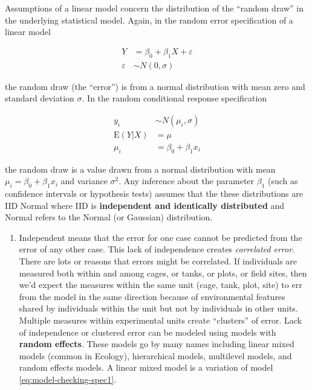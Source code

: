 \documentclass[]{book}
\providecommand{\tightlist}{%
  \setlength{\itemsep}{0pt}\setlength{\parskip}{0pt}}
\begin{document}
Assumptions of a linear model concern the distribution of the ``random draw'' in the underlying statistical model. Again, in the random error specification of a linear model

\begin{align}
Y &= \beta_0 + \beta_1 X + \varepsilon\\
\varepsilon &\sim N(0, \sigma)
\label{eq:model-checking-spec1}
\end{align}

the random draw (the ``error'') is from a normal distribution with mean zero and standard deviation \(\sigma\). In the random conditional response specification

\begin{align}
y_i &\sim N(\mu_i, \sigma)\\
\mathrm{E}(Y|X) &= \mu\\
\mu_i &= \beta_0 + \beta_1 x_i
\label{eq:model-checking-spec2}
\end{align}

the random draw is a value drawn from a normal distribution with mean \(\mu_i = \beta_0 + \beta_1 x_i\) and variance \(\sigma^2\). Any inference about the parameter \(\beta_1\) (such as confidence intervals or hypothesis tests) assumes that the these distributions are IID Normal where IID is \textbf{independent and identically distributed} and Normal refers to the Normal (or Gaussian) distribution.

\begin{enumerate}
\def\labelenumi{\arabic{enumi}.}
\tightlist
\item
  Independent means that the error for one case cannot be predicted from the error of any other case. This lack of independence creates \emph{correlated error}. There are lots or reasons that errors might be correlated. If individuals are measured both within and among cages, or tanks, or plots, or field sites, then we'd expect the measures within the same unit (cage, tank, plot, site) to err from the model in the same direction because of environmental features shared by individuals within the unit but not by individuals in other units. Multiple measures within experimental units create ``clusters'' of error. Lack of independence or clustered error can be modeled using models with \textbf{random effects}. These models go by many names including linear mixed models (common in Ecology), hierarchical models, multilevel models, and random effects models. A linear mixed model is a variation of model \eqref{eq:model-checking-spec1}.
\end{enumerate}
\end{document}
